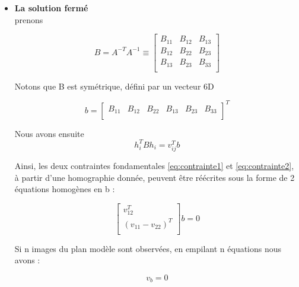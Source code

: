  \begin{itemize}[label={\Huge$\star$}]
 	\item \textbf{La solution fermé}
 	\\
 	
 	prenons 
 	
 	\begin{equation}
 	B
 	=
 	A^{-T}
 	A^{-1}
 	\equiv
 	\left[ 
 	\begin{array}{ccc}
 		B_{11} & B_{12} & B_{13} \\
 		B_{12} & B_{22} & B_{23}\\
 	    B_{13} & B_{23} & B_{33} \\
 	\end{array} \right]
 	\label{eq:solution fermé1}
 	\end{equation}
 	
 Notons que B est symétrique, défini par un vecteur 6D
 
\begin{equation}
 b
 =
 \left[ 
 \begin{array}{cccccc}
B_{11} & B_{12}  & B_{22} & B_{13} & B_{23} & B_{33}\\
 \end{array} \right]^{T}
\label{eq:solution fermé 2}
\end{equation}
 	
 Nous avons ensuite
 \begin{equation}
  h_{i}^{T}Bh_{i}
  =
  v_{ij}^{T}b
  \label{eq:solution fermé 3}
\end{equation}
  
  Ainsi, les deux contraintes fondamentales \ref{eq:contrainte1} et \ref{eq:contrainte2}, à partir d'une 
  homographie donnée, peuvent être réécrites sous la forme de 2 équations homogènes en b :	
  
 \begin{equation}
  \left[ 
  \begin{array}{c}
  	 v_{12}^{T} \\
  	 (v_{11}-v_{22})^{T}\\
  \end{array} \right]b
  =
  0
\label{eq:solution fermé 4}
\end{equation}

 Si n images du plan modèle sont observées, en empilant n équations nous avons :
 
  \begin{equation}
 v_b = 0
 \label{eq:solution fermé 5}
 \end{equation}
 

\end{itemize}

